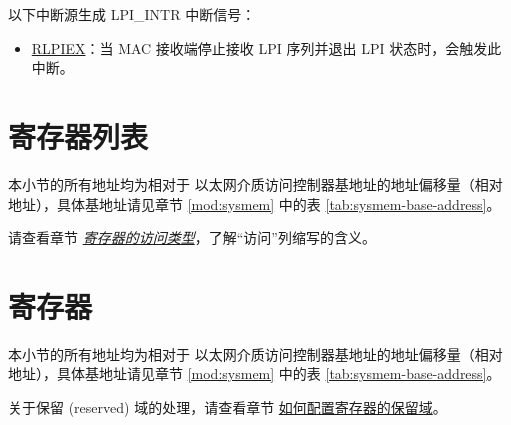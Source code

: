 \documentclass[main\_\_CN.tex]{subfiles}
\begin{document}
以下中断源生成 LPI\_INTR 中断信号：
\begin{itemize}
\item \hyperref[regdesc:EMACLPICSRREG]{RLPIEX}：当 MAC 接收端停止接收 LPI 序列并退出 LPI 状态时，会触发此中断。
\end{itemize}







\newpage
\hypertarget{ethernetmac-reg-summ}{}
\section{寄存器列表}
\label{sec:ethernetmac-reg-summ}

本小节的所有地址均为相对于 以太网介质访问控制器基地址的地址偏移量（相对地址），具体基地址请见章节 \ref{mod:sysmem} \textit{} 中的表 \ref{tab:sysmem-base-address}。

请查看章节 \hyperref[glossary-access-types]{\textit{寄存器的访问类型}}，了解“访问”列缩写的含义。





\newpage
\section{寄存器}

本小节的所有地址均为相对于 以太网介质访问控制器基地址的地址偏移量（相对地址），具体基地址请见章节 \ref{mod:sysmem} \textit{} 中的表 \ref{tab:sysmem-base-address}。

关于保留 (reserved) 域的处理，请查看章节 \hyperref[programming-reserved-field]{如何配置寄存器的保留域}。


\end{document}
